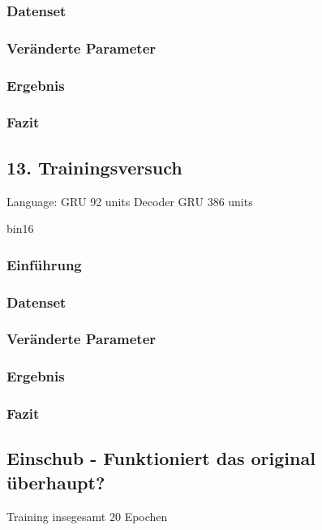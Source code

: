 \documentclass[pdftex,a4paper,halfparskip, article]{scrartcl}
\begin{document}
\subsubsection*{Datenset}
\subsubsection*{Veränderte Parameter}
\subsubsection*{Ergebnis}
\subsubsection*{Fazit}

\subsection{13. Trainingsversuch}
Language: GRU 92 units
Decoder GRU 386 units

bin16
\subsubsection*{Einführung}
\subsubsection*{Datenset}
\subsubsection*{Veränderte Parameter}
\subsubsection*{Ergebnis}
\subsubsection*{Fazit}

\subsection{Einschub - Funktioniert das original überhaupt?}
Training insegesamt 20 Epochen
\end{document}
